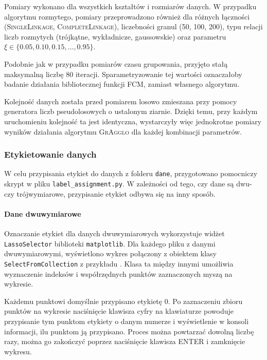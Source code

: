 \documentclass[a4paper,twoside,12pt]{book}
\newcommand{\procedura}[1]{\textsc{#1}}
\newcommand{\SingleLinkage}{\procedura{Si\-ng\-le\-Lin\-ka\-ge}}
\newcommand{\CompleteLinkage}{\procedura{Com\-ple\-te\-Lin\-ka\-ge}}
\newcommand{\MojAlg}{\procedura{GrAgglo}}
\begin{document}
Pomiary wykonano dla wszystkich kształtów i rozmiarów danych. W przypadku algorytmu rozmytego, pomiary przeprowadzono również dla różnych łączności (\SingleLinkage{}, \CompleteLinkage{}), liczebności granul (50, 100, 200), typu relacji liczb rozmytych (trójkątne, wykładnicze, gaussowskie) oraz parametru $\xi \in \{ \num{0.05}, \num{0.10}, \num{0.15}, \ldots, \num{0.95} \}$. 

Podobnie jak w przypadku pomiarów czasu grupowania, przyjęto stałą maksymalną liczbę 80 iteracji. Sparametryzowanie tej wartości oznaczałoby badanie działania bibliotecznej funkcji FCM, zamiast własnego algorytmu.

Kolejność danych została przed pomiarem losowo zmieszana przy pomocy generatora liczb pseudolosowych o ustalonym ziarnie. Dzięki temu, przy każdym uruchomieniu kolejność ta jest identyczna, wystarczyły więc jednokrotne pomiary wyników działania algorytmu \MojAlg{} dla każdej kombinacji parametrów.

\subsubsection{Etykietowanie danych}
\label{sec:etykietowanie-danych}

W celu przypisania etykiet do danych z folderu \texttt{dane}, przygotowano pomocniczy skrypt w pliku \texttt{label\_assignment.py}. W zależności od tego, czy dane są dwu- czy trójwymiarowe, przypisanie etykiet odbywa się na inny sposób.

\paragraph{Dane dwuwymiarowe}

Oznaczanie etykiet dla danych dwuwymiarowych wykorzystuje widżet \texttt{LassoSelector} biblioteki \texttt{matplotlib}. Dla każdego pliku z danymi dwuwymiarowymi, wyświetlono wykres połączony z obiektem klasy \texttt{SelectFromCollection} z przykładu \cite{bib:mplt-lasso}. Klasa ta między innymi umożliwia wyznaczenie indeksów i współrzędnych punktów zaznaczonych myszą na wykresie. 

Każdemu punktowi domyślnie przypisano etykietę 0. Po zaznaczeniu zbioru punktów na wykresie naciśnięcie klawisza cyfry na klawiaturze powoduje przypisanie tym punktom etykiety o danym numerze i wyświetlenie w konsoli informacji, ilu punktom ją przypisano. Proces można powtarzać dowolną liczbę razy, można go zakończyć poprzez naciśnięcie klawisza ENTER i zamknięcie wykresu.
\end{document}

